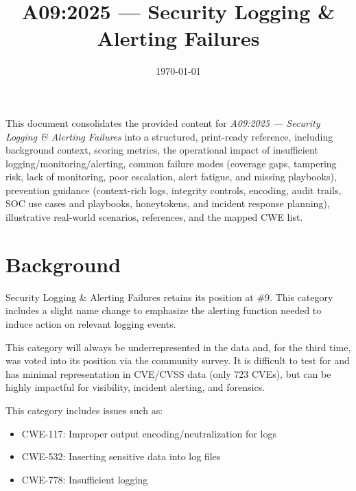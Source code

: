 \documentclass[11pt]{article}
\title{\textbf{A09:2025 — Security Logging \& Alerting Failures}}
\date{\today}
\begin{document}
\maketitle

\begin{infobox}
This document consolidates the provided content for \textit{A09:2025 — Security Logging \& Alerting Failures} into a structured, print-ready reference, including background context, scoring metrics, the operational impact of insufficient logging/monitoring/alerting, common failure modes (coverage gaps, tampering risk, lack of monitoring, poor escalation, alert fatigue, and missing playbooks), prevention guidance (context-rich logs, integrity controls, encoding, audit trails, SOC use cases and playbooks, honeytokens, and incident response planning), illustrative real-world scenarios, references, and the mapped CWE list.
\end{infobox}

\tableofcontents
\newpage

\section{Background}
Security Logging \& Alerting Failures retains its position at \#9. This category includes a slight name change to emphasize the alerting function needed to induce action on relevant logging events.

This category will always be underrepresented in the data and, for the third time, was voted into its position via the community survey. It is difficult to test for and has minimal representation in CVE/CVSS data (only 723 CVEs), but can be highly impactful for visibility, incident alerting, and forensics.

This category includes issues such as:
\begin{itemize}
  \item CWE-117: Improper output encoding/neutralization for logs
  \item CWE-532: Inserting sensitive data into log files
  \item CWE-778: Insufficient logging
\end{itemize}
\end{document}
